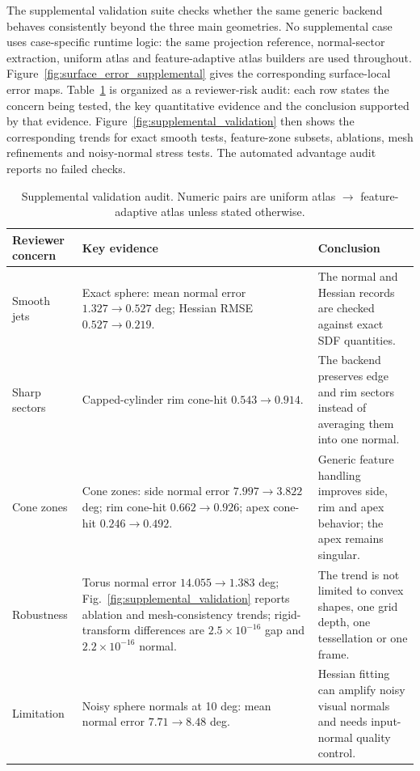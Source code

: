 \documentclass[preprint,12pt,sort&compress]{elsarticle}
\begin{document}
The supplemental validation suite checks whether the same generic backend behaves consistently beyond the three main geometries. No supplemental case uses case-specific runtime logic: the same projection reference, normal-sector extraction, uniform atlas and feature-adaptive atlas builders are used throughout. Figure~\ref{fig:surface_error_supplemental} gives the corresponding surface-local error maps. Table~\ref{tab:supplemental_results} is organized as a reviewer-risk audit: each row states the concern being tested, the key quantitative evidence and the conclusion supported by that evidence. Figure~\ref{fig:supplemental_validation} then shows the corresponding trends for exact smooth tests, feature-zone subsets, ablations, mesh refinements and noisy-normal stress tests. The automated advantage audit reports no failed checks.

\begin{table}[htbp]
\centering
\caption{Supplemental validation audit. Numeric pairs are uniform atlas $\rightarrow$ feature-adaptive atlas unless stated otherwise.}
\label{tab:supplemental_results}
{\footnotesize
\setlength{\tabcolsep}{4pt}
\renewcommand{\arraystretch}{0.94}
\begin{tabularx}{\textwidth}{@{}>{\raggedright\arraybackslash}p{}>{\raggedright\arraybackslash}p{}>{\raggedright\arraybackslash}X@{}}
\toprule
Reviewer concern & Key evidence & Conclusion\\
\midrule
Smooth jets &
Exact sphere: mean normal error $1.327\rightarrow\mathbf{0.527}$ deg; Hessian RMSE $0.527\rightarrow\mathbf{0.219}$. &
The normal and Hessian records are checked against exact SDF quantities.\\
Sharp sectors &
Capped-cylinder rim cone-hit $0.543\rightarrow\mathbf{0.914}$. &
The backend preserves edge and rim sectors instead of averaging them into one normal.\\
Cone zones &
Cone zones: side normal error $7.997\rightarrow\mathbf{3.822}$ deg; rim cone-hit $0.662\rightarrow\mathbf{0.926}$; apex cone-hit $0.246\rightarrow\mathbf{0.492}$. &
Generic feature handling improves side, rim and apex behavior; the apex remains singular.\\
Robustness &
Torus normal error $14.055\rightarrow\mathbf{1.383}$ deg; Fig.~\ref{fig:supplemental_validation} reports ablation and mesh-consistency trends; rigid-transform differences are $2.5{\times}10^{-16}$ gap and $2.2{\times}10^{-16}$ normal. &
The trend is not limited to convex shapes, one grid depth, one tessellation or one frame.\\
Limitation &
Noisy sphere normals at 10 deg: mean normal error $7.71\rightarrow8.48$ deg. &
Hessian fitting can amplify noisy visual normals and needs input-normal quality control.\\
\bottomrule
\end{tabularx}
}
\end{table}
\end{document}
